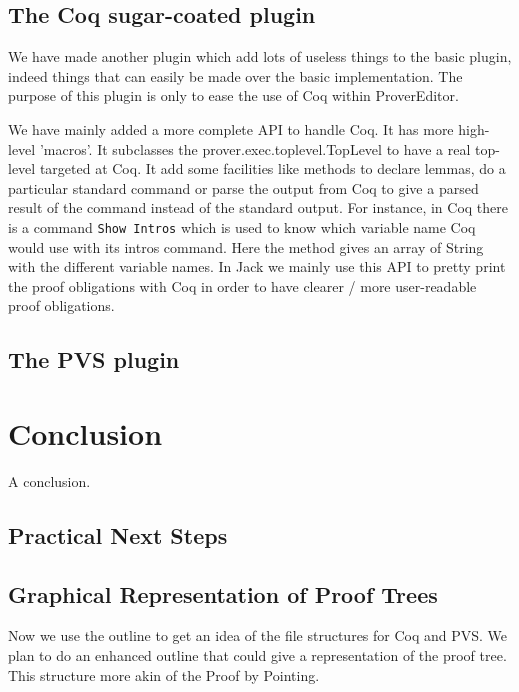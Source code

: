\documentclass{entcs}
\begin{document}
\subsection{The Coq sugar-coated plugin}
We have made another plugin which add lots of useless things to the basic plugin,
indeed things that can easily be made over the basic implementation.
The purpose of this plugin is only to ease the use of Coq within ProverEditor.

We have mainly added a more complete API to handle Coq. It has more high-level
'macros'. It subclasses the prover.exec.toplevel.TopLevel to have a real top-level
targeted at Coq. It add some facilities like methods to declare lemmas, do a particular
standard command or parse the output from Coq to give a parsed result of the command
instead of the standard output. For instance, in Coq there is a command {\tt Show Intros} which
is used to know which variable name Coq would use with its  intros command. Here the
method gives an array of String with the different variable names.
In Jack we mainly use this API to pretty print the proof obligations with Coq in order
to have clearer / more user-readable proof obligations.

\subsection{The PVS plugin}
\section{Conclusion}

A conclusion.

\subsection{Practical Next Steps}

\subsection{Graphical Representation of Proof Trees}
Now we use the outline to get an idea of the file structures for Coq and PVS.
We plan to do an enhanced outline that could give a representation
of the proof tree. This structure more akin of the Proof by Pointing.
\end{document}
